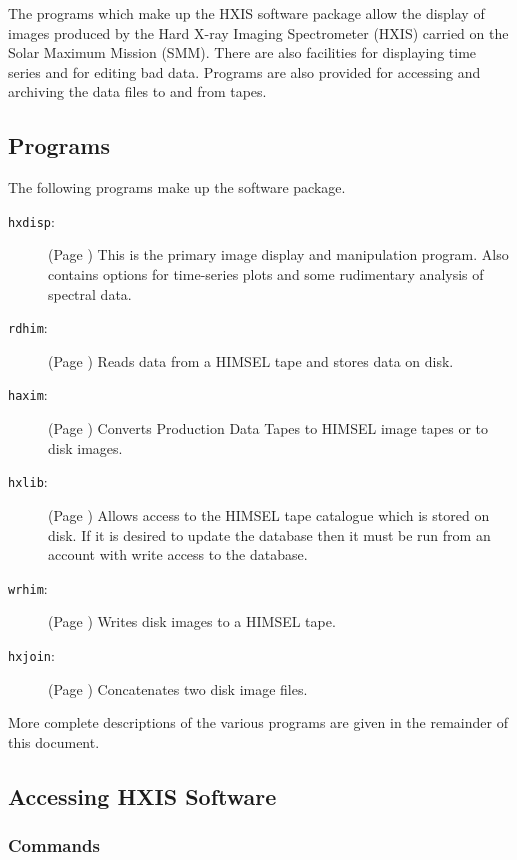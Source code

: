 The programs which make up the HXIS software package allow the display
of images produced by the Hard X-ray Imaging Spectrometer (HXIS)
carried on the Solar Maximum Mission (SMM). There are also facilities
for displaying time series and for editing bad data. Programs are also
provided for accessing and archiving the data files to and from tapes.

\subsection{Programs}

The following programs make up the software package.

\begin{description}
\item[\verb!hxdisp!: ] (Page \pageref{HXDISP}) This is the primary
image display and manipulation program. Also contains options for
time-series plots and some rudimentary analysis of spectral data.

\item[\verb!rdhim!: ]  (Page \pageref{RDHIM}) Reads data from a HIMSEL
tape and stores data on disk.

\item[\verb!haxim!: ] (Page \pageref{HAXIM}) Converts Production Data
Tapes to HIMSEL image tapes or to disk images.

\item[\verb!hxlib!: ] (Page \pageref{HXLIB}) Allows access to the HIMSEL tape
catalogue which is stored on disk. If it is desired to update the
database then it must be run from an account with write access to the
database.

\item[\verb!wrhim!: ] (Page \pageref{WRHIM}) Writes disk images to a
HIMSEL tape.

\item[\verb!hxjoin!: ] (Page \pageref{HXJOIN}) Concatenates two disk
image files.
\end{description}

More complete descriptions of the various programs are given in the
remainder of this document.

\subsection{Accessing HXIS Software}

\subsubsection{Commands}

